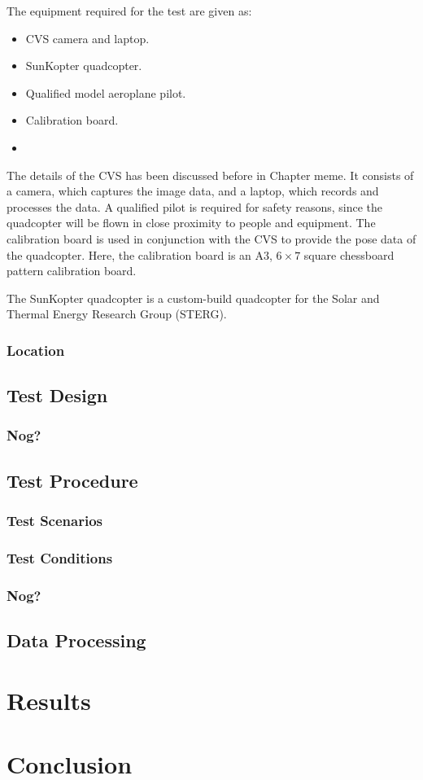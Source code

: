The equipment required for the test are given as:

\begin{itemize}
    \item CVS camera and laptop.
    \item SunKopter quadcopter.
    \item Qualified model aeroplane pilot.
    \item Calibration board.
    \item 
\end{itemize}

The details of the CVS has been discussed before in Chapter meme. It consists of a camera, which captures the image data, and a laptop, which records and processes the data. A qualified pilot is required for safety reasons, since the quadcopter will be flown in close proximity to people and equipment. The calibration board is used in conjunction with the CVS to provide the pose data of the quadcopter. Here, the calibration board is an A3, $6\times7$ square chessboard pattern calibration board. 

The SunKopter quadcopter is a custom-build quadcopter for the Solar and Thermal Energy Research Group (STERG). 

\subsubsection{Location}

\subsection{Test Design}

\subsubsection{Nog?}

\subsection{Test Procedure}

\subsubsection{Test Scenarios}

\subsubsection{Test Conditions}

\subsubsection{Nog?}

\subsection{Data Processing}

\section{Results}

\section{Conclusion}


